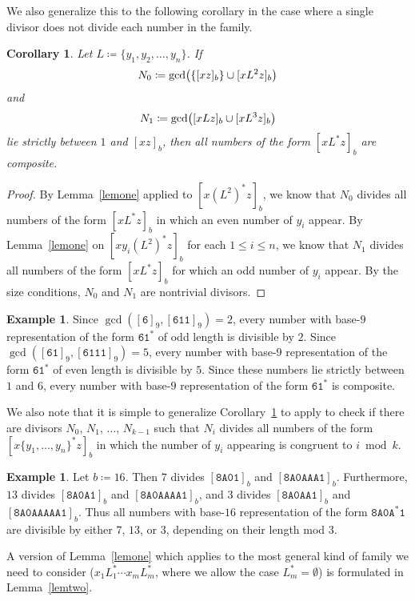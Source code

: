 \documentclass[12pt]{article}
\DeclarePairedDelimiter\paren{\lparen}{\rparen}
\theoremstyle{plain}
\newtheorem{corollary}[theorem]{Corollary}
\theoremstyle{definition}
\newtheorem{example}[theorem]{Example}
\newcommand{\0}{\mathtt{0}}
\newcommand{\1}{\mathtt{1}}
\newcommand{\2}{\mathtt{2}}
\newcommand{\3}{\mathtt{3}}
\newcommand{\4}{\mathtt{4}}
\newcommand{\5}{\mathtt{5}}
\newcommand{\6}{\mathtt{6}}
\newcommand{\7}{\mathtt{7}}
\newcommand{\8}{\mathtt{8}}
\newcommand{\9}{\mathtt{9}}
\newcommand{\A}{\mathtt{A}}
\newcommand{\union}{\cup}
\begin{document}
We also generalize this to the following corollary in the case where 
a single divisor does not divide each number in the family.
\begin{corollary}\label{cortwo}
Let $L \coloneqq \lbrace y_1, y_2, \ldots, y_n \rbrace$.
If \[N_0\coloneqq\gcd \paren[\big]{ \{ [xz]_b \} \union [xL^2 z]_b} \]
and
\[ N_1\coloneqq \gcd \paren[\big]{[xLz]_b \union [xL^3z]_b} \]
lie strictly between $1$ and $[xz]_b$, then all numbers of the form 
$[xL^*z]_b$ are composite.
\end{corollary}
\begin{proof}
By Lemma~\ref{lemone} applied
to $[x(L^2)^*z]_b$, we know that $N_0$ divides all numbers of the 
form $[x L^* z]_b$ in which an even number of $y_i$ appear.
By Lemma~\ref{lemone} on $[xy_i(L^2)^*z]_b$ 
for each $1\leq i\leq n$, we know that $N_1$ 
divides all numbers of the form $[x L^* z]_b$ for which an 
odd number of $y_i$ appear.
By the size conditions, $N_0$ and $N_1$ are nontrivial divisors.
\end{proof}

\begin{example}
Since $\gcd([\6]_9,[\6\1\1]_9)=2$, every number with
base-$9$ representation of the form $\6\1^*$ of 
odd length is divisible by $2$.
Since $\gcd([\6\1]_9,[\6\1\1\1]_9)=5$,
every number with base-$9$ representation of the form $\6\1^*$ 
of even length is divisible by $5$.  Since these numbers lie 
strictly between $1$ and $6$, every number with base-$9$
representation of the form $\6\1^*$ is 
composite.
\end{example}

We also note that it is simple to generalize Corollary~\ref{cortwo}
to apply to 
check if there are divisors $N_0$, $N_1$, $\dotsc$, $N_{k-1}$ such that
$N_i$ divides all numbers of the form $[x\{y_1,\dotsc,y_n\}^*z]_b$ in which 
the number of $y_i$ appearing is congruent to $i\bmod k$.
\begin{example}
Let $b \coloneqq 16$.
Then
$7$ divides $[\8\A\0\1]_b$ and $[\8\A\0\A\A\A\1]_b$.
Furthermore, $13$ divides 
$[\8\A\0\A\1]_b$ and $[\8\A\0\A\A\A\A\1]_b$,
and $3$ divides $[\8\A\0\A\A\1]_b$ and 
$[\8\A\0\A\A\A\A\A\1]_b$.  Thus all numbers with base-$16$
representation of the form $\8\A\0\A^*\1$ are 
divisible by either $7$, $13$, or $3$, depending on their 
length mod $3$.
\end{example}

A version of Lemma~\ref{lemone} which applies to the most general kind 
of family we need to consider ($x_1L_1^*\dotsm x_mL_m^*$, where we allow the case $L_m^*=\emptyset$)
is formulated in Lemma~\ref{lemtwo}.
\end{document}
